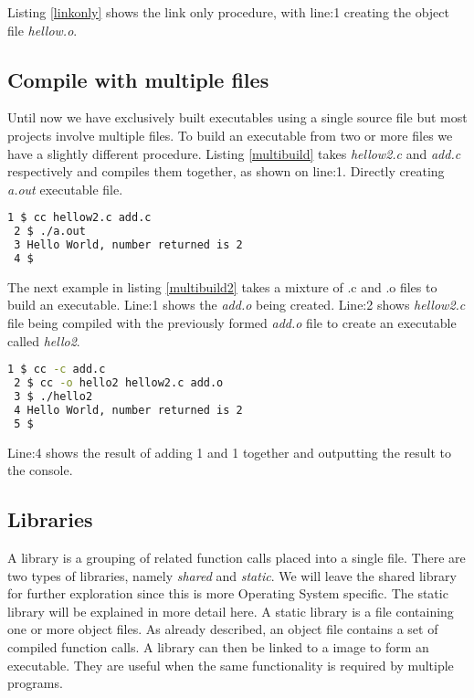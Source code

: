 Listing \ref{linkonly} shows the link only procedure, with line:1 creating the object file \textit{hellow.o}.

\subsection{Compile with multiple files}

Until now we have exclusively built executables using a single source file but most projects involve multiple files. To build an executable from two or more files we have a slightly different procedure. Listing \ref{multibuild} takes \textit{hellow2.c} and \textit{add.c} respectively and compiles them together, as shown on line:1. Directly creating \textit{a.out} executable file.\\

\begin{lstlisting}[language=bash,showstringspaces=false,caption={Example compiling and linking multiple files},captionpos=b,label=multibuild]
 1 $ cc hellow2.c add.c
 2 $ ./a.out
 3 Hello World, number returned is 2
 4 $ 	
\end{lstlisting}

The next example in listing \ref{multibuild2} takes a mixture of .c and .o files to build an executable. Line:1 shows the \textit{add.o} being created. Line:2 shows \textit{hellow2.c} file being compiled with the previously formed \textit{add.o} file to create an executable called \textit{hello2}.\\

\begin{lstlisting}[language=bash,showstringspaces=false,caption={Example compiling and linking multiple files with a specified execution name},captionpos=b,label=multibuild2]
 1 $ cc -c add.c
 2 $ cc -o hello2 hellow2.c add.o
 3 $ ./hello2 
 4 Hello World, number returned is 2
 5 $ 	
\end{lstlisting}

Line:4 shows the result of adding 1 and 1 together and outputting the result to the console.

\subsection{Libraries}


A library is a grouping of related function calls placed into a single file. There are two types of libraries, namely \textit{shared} and \textit{static}. We will leave the shared library for further exploration since this is more Operating System specific. The static library will be explained in more detail here. A static library is a file containing one or more object files. As already described, an object file contains a set of compiled function calls. A library can then be linked to a image to form an executable. They are useful when the same functionality is required by multiple programs.\\  

